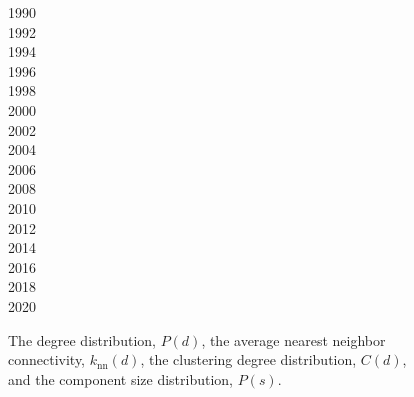 \begin{figure}[tbp]
\begin{minipage}{0.05\linewidth}
\colorbox{col1!50}{1990} \\
\colorbox{col3!50}{1992} \\
\colorbox{col5!50}{1994} \\
\colorbox{col7!50}{1996} \\
\colorbox{col9!50}{1998} \\
\colorbox{col11!50}{2000} \\
\colorbox{col13!50}{2002} \\
\colorbox{col15!50}{2004} \\
\colorbox{col17!50}{2006} \\
\colorbox{col19!50}{2008} \\
\colorbox{col21!50}{2010} \\
\colorbox{col23!50}{2012} \\
\colorbox{col25!50}{2014} \\
\colorbox{col27!50}{2016} \\
\colorbox{col29!50}{2018} \\
\colorbox{col31!50}{2020} \\
\end{minipage}
\caption{The degree distribution, $P(d)$, the average nearest neighbor connectivity, $k_{\mathrm{nn}}(d)$, the clustering degree distribution, $C(d) $, and the component size distribution, $P(s)$.}
\label{fig:network-distr}
\end{figure}

